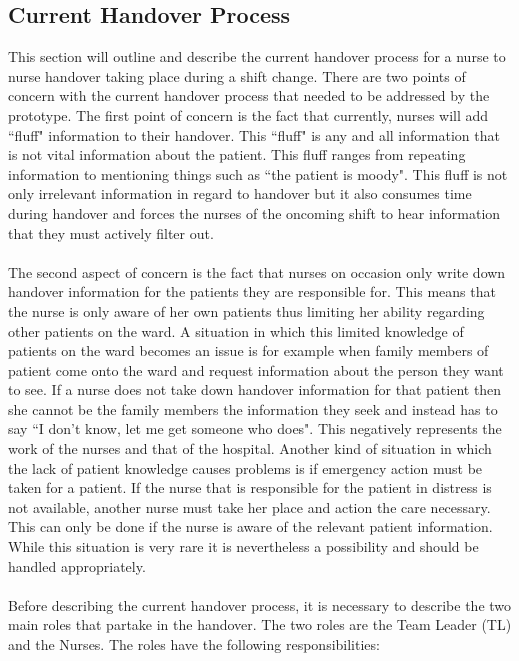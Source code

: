 \subsection{Current Handover Process}
\label{Current Handover Process}
This section will outline and describe the current handover process for a nurse to nurse handover taking place during a shift change. There are two points of concern with the current handover process that needed to be addressed by the prototype. The first point of concern is the fact that currently, nurses will add ``fluff" information to their handover. This ``fluff" is any and all information that is not vital information about the patient. This fluff ranges from repeating information to mentioning things such as ``the patient is moody". This fluff is not only irrelevant information in regard to handover but it also consumes time during handover and forces the nurses of the oncoming shift to hear information that they must actively filter out.
\\ \\
The second aspect of concern is the fact that nurses on occasion only write down handover information for the patients they are responsible for. This means that the nurse is only aware of her own patients thus limiting her ability regarding other patients on the ward. A situation in which this limited knowledge of patients on the ward becomes an issue is for example when family members of patient come onto the ward and request information about the person they want to see. If a nurse does not take down handover information for that patient then she cannot be the family members the information they seek and instead has to say ``I don't know, let me get someone who does". This negatively represents the work of the nurses and that of the hospital. Another kind of situation in which the lack of patient knowledge causes problems is if emergency action must be taken for a patient. If the nurse that is responsible for the patient in distress is not available, another nurse must take her place and action the care necessary. This can only be done if the nurse is aware of the relevant patient information. While this situation is very rare it is nevertheless a possibility and should be handled appropriately. 
\\ \\
Before describing the current handover process, it is necessary to describe the two main roles that partake in the handover. The two roles are the Team Leader (TL) and the Nurses. The roles have the following responsibilities: \\ \\

